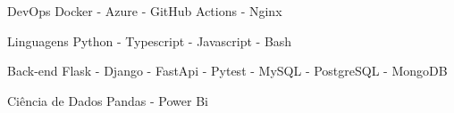 

\begin{cvskills}

  \cvskill
    {DevOps} %
    {Docker - Azure - GitHub Actions - Nginx} %

  \cvskill
    {Linguagens} %
    {Python - Typescript - Javascript - Bash} %

  \cvskill
    {Back-end} %
    {Flask - Django - FastApi - Pytest -  MySQL - PostgreSQL - MongoDB} %

  \cvskill
    {Ciência de Dados} %
    {Pandas - Power Bi} %

\end{cvskills}
